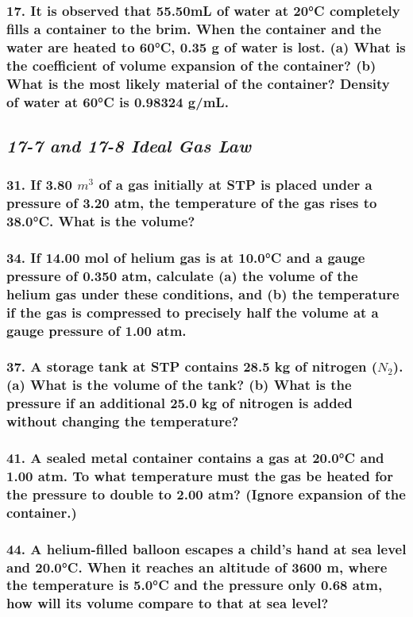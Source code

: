 \documentclass{article}
\begin{document}
\subsubsection*{
    17. It is observed that 55.50mL of water at 20°C completely fills a container
    to the brim. When the container and the water are heated to 60°C, 0.35 g of
    water is lost. (a) What is the coefficient of volume expansion of the container?
    (b) What is the most likely material of the container? Density of water at 60°C
    is 0.98324 g/mL.
}
\newpage
\begin{center}
    \subsection*{\textbf{\textit{17-7 and 17-8 Ideal Gas Law}}}
\end{center}
\subsubsection*{
    31. If 3.80 $m^3$ of a gas initially at STP is placed under a pressure of 3.20 atm,
    the temperature of the gas rises to 38.0°C. What is the volume?
}
\subsubsection*{
    34. If 14.00 mol of helium gas is at 10.0°C and a gauge pressure of 0.350 atm,
    calculate (a) the volume of the helium gas under these conditions, and (b) the
    temperature if the gas is compressed to precisely half the volume at a gauge
    pressure of 1.00 atm.
}
\subsubsection*{
    37. A storage tank at STP contains 28.5 kg of nitrogen ($N_2$). (a) What is
    the volume of the tank? (b) What is the pressure if an additional 25.0 kg
    of nitrogen is added without changing the temperature?
}
\subsubsection*{
    41. A sealed metal container contains a gas at 20.0°C and 1.00 atm. To what
    temperature must the gas be heated for the pressure to double to 2.00 atm? 
    (Ignore expansion of the container.)
}
\subsubsection*{
    44. A helium-filled balloon escapes a child’s hand at sea level and 20.0°C.
    When it reaches an altitude of 3600 m, where the temperature is 5.0°C and
    the pressure only 0.68 atm, how will its volume compare to that at sea level?
}
\end{document}
